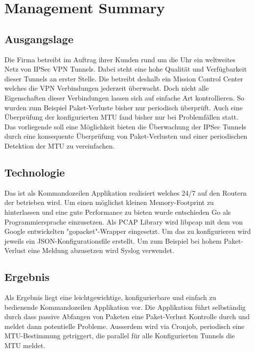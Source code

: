
\chapter*{Management Summary}

\section*{Ausgangslage}
Die Firma \osag betreibt im Auftrag ihrer Kunden rund um die Uhr ein weltweites Netz von \acs{IPSec} \acs{VPN} Tunnels. Dabei steht eine hohe Qualität und Verfügbarkeit dieser Tunnels an erster Stelle. Die \osag betreibt deshalb ein Mission Control Center welches die \acs{VPN} Verbindungen jederzeit überwacht. Doch nicht alle Eigenschaften dieser Verbindungen lassen sich auf einfache Art kontrollieren. So wurden zum Beispiel Paket-Verluste bisher nur periodisch überprüft. Auch eine Überprüfung der konfigurierten \acs{MTU} fand bisher nur bei Problemfällen statt. Das vorliegende \tool soll eine Möglichkeit bieten die Überwachung der \acs{IPSec} Tunnels durch eine konsequente Überprüfung von Paket-Verlusten und einer periodischen Detektion der \acs{MTU} zu vereinfachen.

\section*{Technologie}
Das \tool ist als Kommandozeilen Applikation realisiert welches 24/7 auf den Routern der \osag betrieben wird. Um einen möglichst kleinen Memory-Footprint zu hinterlassen und eine gute Performance zu bieten wurde entschieden Go als Programmiersprache einzusetzen. Als \acs{PCAP} Library wird libpcap mit dem von Google entwickelten "gopacket"-Wrapper eingesetzt. Um das \tool zu konfigurieren wird jeweils ein JSON-Konfigurationsfile erstellt. Um zum Beispiel bei hohem Paket-Verlust eine Meldung abzusetzen wird Syslog verwendet.

\section*{Ergebnis}
Als Ergebnis liegt eine leichtgewichtige, konfigurierbare und einfach zu bedienende Kommandozeilen Applikation vor. Die Applikation führt selbständig durch dass passive Abfangen von Paketen eine Paket-Verlust Kontrolle durch und meldet dann potentielle Probleme. Ausserdem wird via Cronjob, periodisch eine \acs{MTU}-Bestimmung getriggert, die parallel für alle Konfigurierten Tunnels die \acs{MTU} meldet.

